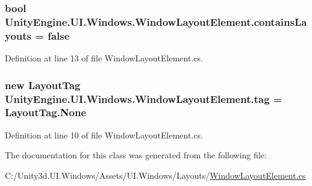 \subsubsection[{contains\+Layouts}]{\setlength{\rightskip}{0pt plus 5cm}bool Unity\+Engine.\+U\+I.\+Windows.\+Window\+Layout\+Element.\+contains\+Layouts = false}\label{class_unity_engine_1_1_u_i_1_1_windows_1_1_window_layout_element_abe164c0ebb1b1a5449bb9e54bf6ca707}


Definition at line 13 of file Window\+Layout\+Element.\+cs.

\hypertarget{class_unity_engine_1_1_u_i_1_1_windows_1_1_window_layout_element_ab09dacf72a3af0032a858cc45842b687}{}
\subsubsection[{tag}]{\setlength{\rightskip}{0pt plus 5cm}new {\bf Layout\+Tag} Unity\+Engine.\+U\+I.\+Windows.\+Window\+Layout\+Element.\+tag = Layout\+Tag.\+None}\label{class_unity_engine_1_1_u_i_1_1_windows_1_1_window_layout_element_ab09dacf72a3af0032a858cc45842b687}


Definition at line 10 of file Window\+Layout\+Element.\+cs.



The documentation for this class was generated from the following file\+:\begin{DoxyCompactItemize}
\item 
C\+:/\+Unity3d.\+U\+I.\+Windows/\+Assets/\+U\+I.\+Windows/\+Layouts/\hyperlink{_window_layout_element_8cs}{Window\+Layout\+Element.\+cs}\end{DoxyCompactItemize}
